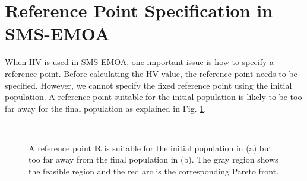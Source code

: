 \documentclass[conference]{IEEEtran}
\begin{document}
%
%
\section{Reference Point Specification in SMS-EMOA}
When HV is used in SMS-EMOA, 
one important issue is how to specify a reference point.
Before calculating the HV value, the reference point needs to be specified.
However, we cannot specify the fixed reference point using the initial population. 
A reference point suitable for the initial population is likely to be too far away 
for the final population as explained in Fig. \ref{rpa1}. 

\begin{figure}[!t]
  \centering
  \quad
  \\
  \caption{A reference point $\boldsymbol R$ is suitable for the initial population in (a) 
  but too far away from the final population in (b).
  The gray region shows the feasible region and the red arc is the corresponding Pareto front.}
  \label{rpa1}
\end{figure}
\end{document}
